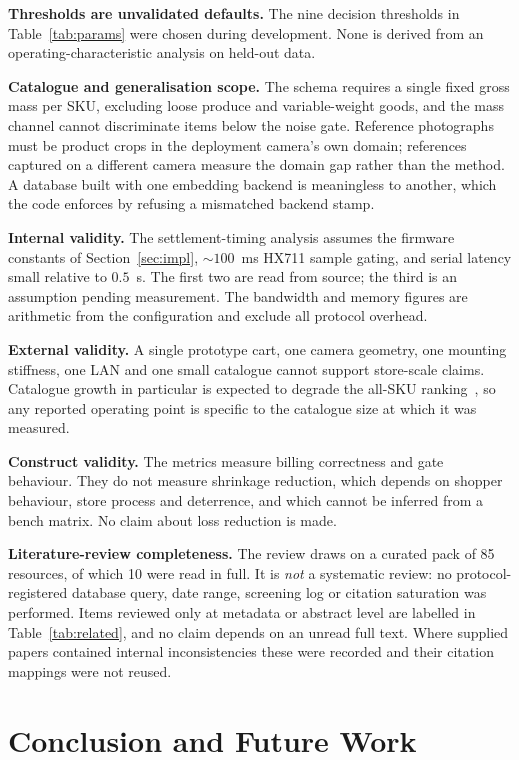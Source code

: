 \documentclass[conference]{IEEEtran}
\begin{document}
\textbf{Thresholds are unvalidated defaults.} The nine decision thresholds in Table~\ref{tab:params}
were chosen during development. None is derived from an operating-characteristic analysis on held-out
data.

\textbf{Catalogue and generalisation scope.} The schema requires a single fixed gross mass per SKU,
excluding loose produce and variable-weight goods, and the mass channel cannot discriminate items
below the noise gate. Reference photographs must be product crops in the deployment camera's own
domain; references captured on a different camera measure the domain gap rather than the method. A
database built with one embedding backend is meaningless to another, which the code enforces by
refusing a mismatched backend stamp.

\textbf{Internal validity.} The settlement-timing analysis assumes the firmware constants of
Section~\ref{sec:impl}, ${\sim}100$~ms HX711 sample gating, and serial latency small relative to
$0.5$~s. The first two are read from source; the third is an assumption pending measurement. The
bandwidth and memory figures are arithmetic from the configuration and exclude all protocol overhead.

\textbf{External validity.} A single prototype cart, one camera geometry, one mounting stiffness, one
LAN and one small catalogue cannot support store-scale claims. Catalogue growth in particular is
expected to degrade the all-SKU ranking~\cite{R07}, so any reported operating point is specific to the
catalogue size at which it was measured.

\textbf{Construct validity.} The metrics measure billing correctness and gate behaviour. They do not
measure shrinkage reduction, which depends on shopper behaviour, store process and deterrence, and
which cannot be inferred from a bench matrix. No claim about loss reduction is made.

\textbf{Literature-review completeness.} The review draws on a curated pack of 85 resources, of which
10 were read in full. It is \emph{not} a systematic review: no protocol-registered database query,
date range, screening log or citation saturation was performed. Items reviewed only at metadata or
abstract level are labelled in Table~\ref{tab:related}, and no claim depends on an unread full text.
Where supplied papers contained internal inconsistencies these were recorded and their citation
mappings were not reused.

\section{Conclusion and Future Work}
\end{document}
